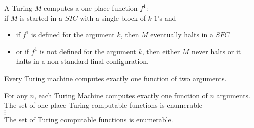 \begin{definition}
A Turing $M$ computes a one-place function $f^1$: \\
if $M$ is started in a $SIC$ with a single block of $k$ $1$'s and
\begin{itemize}
\item if $f^1$ is defined for the argument $k$, then $M$ eventually halts in a $SFC$
\item or if $f^1$ is not defined for the argument $k$, then either $M$ never halts or it halts in a non-standard final configuration.
\end{itemize}
\end{definition}

\begin{remark}
Every Turing machine computes exactly one function of two arguments. %
\end{remark}

\begin{remark}
For any $n$, each Turing Machine computes exactly one function of $n$ arguments.\\
The set of one-place Turing computable functions is enumerable \\
$\vdots$\\
The set of Turing computable functions is enumerable.
\end{remark}




